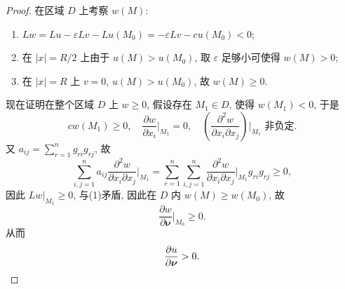 \begin{proof}
  在区域 $D$ 上考察 $w(M)$:
  \begin{enumerate}[(1)]
    \item $Lw=Lu-\varepsilon Lv-Lu(M_0)=-\varepsilon Lv-cu(M_0)<0$;
    \item 在 $|x| = R/2$ 上由于 $u(M)>u(M_0)$,
      取 $\varepsilon$ 足够小可使得 $w(M)>0$;
    \item 在 $|x| = R$ 上 $v=0$, $u(M)>u(M_0)$, 故 $w(M)\geq 0$.
  \end{enumerate}
  现在证明在整个区域 $D$ 上 $w\geq 0$, 假设存在 $M_1\in D$, 使得 $w(M_1) < 0$, 于是
  \[cw(M_1)\geq 0,\quad \frac{\partial w}{\partial x_i}\bigg|_{M_1} = 0,
    \quad\left(\frac{\partial^2w}{\partial x_i\partial x_j}\right)\bigg|_{M_1}\text{ 非负定}.\]
  又 $a_{ij}=\sum_{r=1}^n g_{ri}g_{rj}$, 故
  \[\sum_{i,j=1}^na_{ij}\frac{\partial^2w}{\partial x_i\partial x_j}
    \bigg|_{M_1}=\sum_{r=1}^n\sum_{i,j=1}^n\frac{\partial^2w}{\partial x_i\partial x_j}
    \bigg|_{M_1}g_{ri}g_{rj}\geq 0,\]
  因此 $Lw|_{M_1}\geq 0$, 与(1)矛盾, 因此在 $D$ 内 $w(M)\geq w(M_0)$, 故
  \[\frac{\partial w}{\partial\bm{\nu}}\bigg|_{M_0} \geq 0.\]
  从而
  \[\frac{\partial u}{\partial\bm{\nu}} > 0. \qedhere\]
\end{proof}